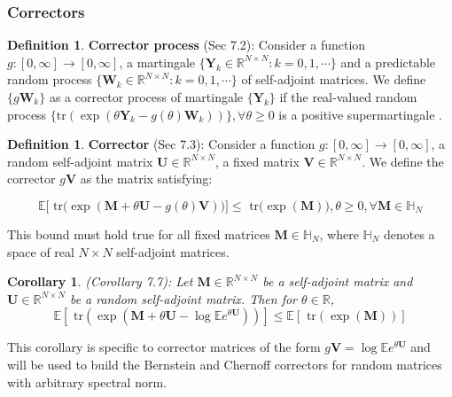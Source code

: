 \documentclass{article}
\def\mM{{\mathbf{M}}}
\def\mU{{\mathbf{U}}}
\def\mV{{\mathbf{V}}}
\def\mW{{\mathbf{W}}}
\def\mY{{\mathbf{Y}}}
\def\sR{{\mathbb{R}}}
\theoremstyle{plain}
\newtheorem{corollary}[theorem]{Corollary}
\theoremstyle{definition}
\newtheorem{definition}[theorem]{Definition}
\theoremstyle{remark}
\begin{document}
\subsubsection{Correctors}

\begin{definition}
\textbf{Corrector process} \citep{tropp2019matrix}(Sec 7.2): Consider a function $g: [0, \infty] \rightarrow [0, \infty]$, a martingale $\{ \mY_k \in \sR^{N \times N} : k = 0, 1, \cdots\}$ and a predictable random process $\{ \mW_k \in \sR^{N \times N} : k = 0, 1, \cdots\}$ of self-adjoint matrices. We define $\{g \mW_k\}$ as a corrector process of martingale $\{\mY_k\}$ if the real-valued random process $\{ \text{tr}(\exp(\theta \mY_k - g(\theta)\mW_k)) \}, \forall \theta \ge 0$ is a positive supermartingale \citep{williams1991probability, chow2003probability}. 
\end{definition}

\begin{definition}
\textbf{Corrector} \citep{tropp2019matrix}(Sec 7.3): Consider a function $g: [0, \infty] \rightarrow [0, \infty]$, a random self-adjoint matrix $\mU \in \sR^{N \times N}$, a fixed matrix $\mV \in \sR^{N \times N}$. We  define the corrector $g\mV$ as the matrix satisfying:

\begin{equation}
\mathbb{E} \big[ \text{ tr}\big( \exp(\mM + \theta \mU - g(\theta)\mV) \big) \big] \le \text{ tr}\big(\exp(\mM)\big), \theta \ge 0, \forall \mM \in \mathbb{H}_N
\end{equation}

This bound must hold true for all fixed matrices $\mM \in \mathbb{H}_N$, where $\mathbb{H}_N$ denotes a space of real $N \times N$ self-adjoint matrices.
\end{definition}

\begin{corollary}
\label{cor:tropp_lieb}
\citep{tropp2019matrix}(Corollary 7.7): Let $\mM \in \sR^{N \times N}$ be a self-adjoint matrix and $\mU \in \sR^{N \times N}$ be a random self-adjoint matrix. Then for $\theta \in \sR$, 
\begin{equation}
    \mathbb{E} [ \text{ tr}( \exp(\mM + \theta\mU - \log \mathbb{E}e^{\theta\mU}) )] \le \mathbb{E}[ \text{ tr}( \exp(\mM)) ]
\end{equation}

\end{corollary}

This corollary is specific to corrector matrices of the form $g\mV = \log \mathbb{E}e^{\theta\mU}$ and will be used to build the Bernstein and Chernoff correctors for random matrices with arbitrary spectral norm.
\end{document}
